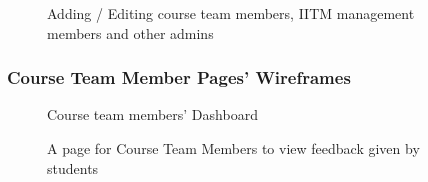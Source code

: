 \begin{figure}[H]
    \centering
    \caption{Adding / Editing course team members, IITM management members and other admins}
    \label{fig:admin_ae_entity}
\end{figure}


\subsubsection{Course Team Member Pages' Wireframes}
\begin{figure}[H]
    \centering
    \caption{Course team members' Dashboard}
    \label{fig:ctm_dash}
\end{figure}

\begin{figure}[H]
    \centering
    \caption{A page for Course Team Members to view feedback given by students}
    \label{fig:ctm_feedback}
\end{figure}

